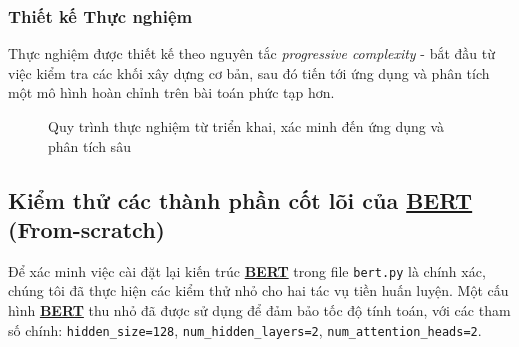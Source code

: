     \subsubsection{Thiết kế Thực nghiệm}
    Thực nghiệm được thiết kế theo nguyên tắc \textit{progressive complexity} - bắt đầu từ việc kiểm tra các khối xây dựng cơ bản, sau đó tiến tới ứng dụng và phân tích một mô hình hoàn chỉnh trên bài toán phức tạp hơn.
    
    \begin{figure}[H]
    \centering
    \caption{Quy trình thực nghiệm từ triển khai, xác minh đến ứng dụng và phân tích sâu}
    \label{fig:experiment_workflow}
    \end{figure}
    
    \subsection{Kiểm thử các thành phần cốt lõi của \hyperref[acro:bert]{\textbf{BERT}} (From-scratch)}
    \label{ssec:kiem_thu_cot_loi}
    Để xác minh việc cài đặt lại kiến trúc \hyperref[acro:bert]{\textbf{BERT}} trong file \texttt{bert.py} là chính xác, chúng tôi đã thực hiện các kiểm thử nhỏ cho hai tác vụ tiền huấn luyện. Một cấu hình \hyperref[acro:bert]{\textbf{BERT}} thu nhỏ đã được sử dụng để đảm bảo tốc độ tính toán, với các tham số chính: \texttt{hidden\_size=128}, \texttt{num\_hidden\_layers=2}, \texttt{num\_attention\_heads=2}.
    
